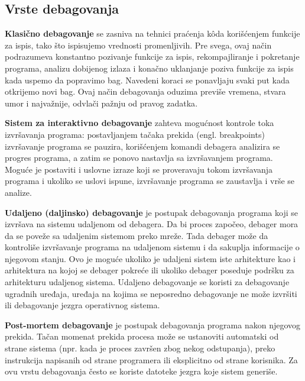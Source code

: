 \documentclass[a4paper]{article}
\begin{document}
\subsection{Vrste debagovanja}
\label{subsec:vrste}

\textbf{Klasično debagovanje} se zasniva na tehnici praćenja k\^{o}da korišćenjem funkcije za ispis, tako što 
ispisujemo vrednosti promenljivih. Pre svega, ovaj način podrazumeva konstantno pozivanje funkcije za 
ispis, rekompajliranje i pokretanje programa, analizu dobijenog izlaza i konačno uklanjanje 
poziva funkcije za ispis kada uspemo da popravimo bag. Navedeni koraci se ponavljaju svaki put 
kada otkrijemo novi bag. Ovaj način debagovanja oduzima previše vremena, stvara umor i najvažnije,
odvlači pažnju od pravog zadatka\cite{art_debugging}.

\textbf{Sistem za interaktivno debagovanje} zahteva mogućnost kontrole toka izvršavanja
programa: postavljanjem tačaka prekida (engl. breakpoints) izvršavanje
programa se pauzira, korišćenjem komandi debagera analizira se progres
programa, a zatim se ponovo nastavlja sa izvršavanjem programa. Moguće
je postaviti i uslovne izraze koji se proveravaju tokom izvršavanja programa i ukoliko se uslovi ispune, izvršavanje programa se 
zaustavlja i vrše se analize.

\textbf{Udaljeno (daljinsko) debagovanje} je postupak debagovanja programa koji se izvršava
na sistemu udaljenom od debagera. Da bi proces započeo, debager mora
da se poveže sa udaljenim sistemom preko mreže. Tada debager može
da kontroliše izvršavanje programa na udaljenom sistemu i da sakuplja
informacije o njegovom stanju. Ovo je moguće ukoliko je udaljeni sistem
iste arhitekture kao i arhitektura na kojoj se debager pokreće ili ukoliko
debager poseduje podršku za arhitekturu udaljenog sistema\cite{vrste_deb}. Udaljeno debagovanje se koristi za 
debagovanje ugradnih uređaja, uređaja na kojima se neposredno debagovanje ne može izvršiti 
ili debagovanje jezgra operativnog sistema\cite{gdb}.

\textbf{Post-mortem debagovanje} je postupak debagovanja programa nakon njegovog prekida. Tačan momenat prekida procesa može se ustanoviti 
automatski od strane sistema (npr. kada je proces završen zbog nekog odstupanja), preko instrukcija napisanih od strane programera ili 
eksplicitno od strane korisnika. Za ovu vrstu debagovanja često se koriste datoteke jezgra koje sistem generiše\cite{vrste_deb}.
\end{document}
